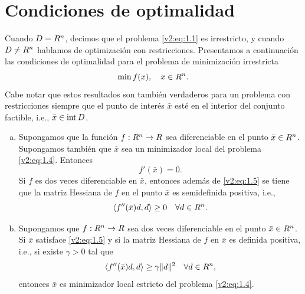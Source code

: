 
\section{Condiciones de optimalidad}
\label{v2:sec:1.2}

Cuando $D = R^n$, decimos que el problema \eqref{v2:eq:1.1} es irrestricto, y cuando $D \neq R^n$ hablamos de optimización con restricciones.
Presentamos a continuación las condiciones de optimalidad para el problema de minimización irrestricta
\begin{equation}
    \min f(x), \quad x \in R^n.
    \label{v2:eq:1.4}
\end{equation}
Cabe notar que estos resultados son también verdaderos para un problema con restricciones siempre que el punto de interés $\bar{x}$ esté en el interior del conjunto factible, i.e., $\bar{x} \in \operatorname{\operatorname{int}} D$.

\begin{theorem}\label{v2:thm:1.2.1}
    \begin{enumerate}[(a)]
        \item Supongamos que la función $f : R^n \to R$ sea diferenciable en el punto $\bar{x} \in R^n$. Supongamos también que $\bar{x}$ sea un minimizador local del problema \eqref{v2:eq:1.4}. Entonces
        \begin{equation}
            f'(\bar{x}) = 0.
            \label{v2:eq:1.5}
        \end{equation}
        Si $f$ es dos veces diferenciable en $\bar{x}$, entonces además de \eqref{v2:eq:1.5} se tiene que la matriz Hessiana de $f$ en el punto $\bar{x}$ es semidefinida positiva, i.e.,
        \begin{equation}
            \langle f''(\bar{x})d, d \rangle \ge 0 \quad \forall d \in R^n.
            \label{v2:eq:1.6}
        \end{equation}
        
        \item Supongamos que $f : R^n \to R$ sea dos veces diferenciable en el punto $\bar{x} \in R^n$. Si $\bar{x}$ satisface \eqref{v2:eq:1.5} y si la matriz Hessiana de $f$ en $\bar{x}$ es definida positiva, i.e., si existe $\gamma > 0$ tal que
        \begin{equation}
            \langle f''(\bar{x})d, d \rangle \ge \gamma \|d\|^2 \quad \forall d \in R^n,
            \label{v2:eq:1.7}
        \end{equation}
        entonces $\bar{x}$ es minimizador local estricto del problema \eqref{v2:eq:1.4}.
    \end{enumerate}
\end{theorem}

